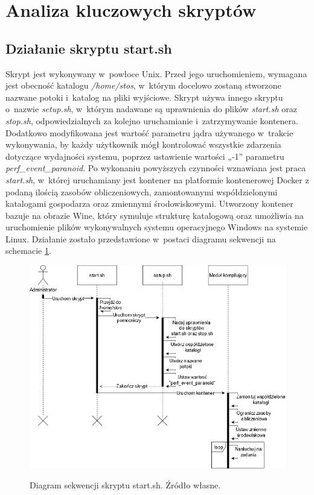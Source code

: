 \section{Analiza kluczowych skryptów}
\subsection{Działanie skryptu start.sh}
\indent Skrypt jest wykonywany w~powłoce Unix. Przed jego uruchomieniem, wymagana jest obecność katalogu \textit{/home/stos}, w~którym docelowo zostaną stworzone nazwane potoki i~katalog na pliki wyjściowe. Skrypt używa innego skryptu o~nazwie \textit{setup.sh}, w~którym nadawane są uprawnienia do plików \textit{start.sh} oraz \textit{stop.sh}, odpowiedzialnych za kolejno uruchamianie i~zatrzymywanie kontenera. Dodatkowo modyfikowana jest wartość parametru jądra używanego w~trakcie wykonywania, by każdy użytkownik mógł kontrolować wszystkie zdarzenia dotyczące wydajności systemu, poprzez ustawienie wartości „-1” parametru \textit{perf\_event\_paranoid}\cite{perf}. Po wykonaniu powyższych czynności wznawiana jest praca \textit{start.sh}, w~której uruchamiany jest kontener na platformie kontenerowej Docker z podaną ilością zasobów obliczeniowych, zamontowanymi współdzielonymi katalogami gospodarza oraz zmiennymi środowiskowymi. Utworzony kontener bazuje na obrazie Wine, który symuluje strukturę katalogową oraz umożliwia na uruchomienie plików wykonywalnych systemu operacyjnego Windows na systemie Linux. Działanie zostało przedstawione w~postaci diagramu sekwencji na schemacie \ref{start}.
\begin{figure}[!h]
	\begin{center}
		\resizebox{1.0\textwidth}{!} {
			\includegraphics{img/2/start.png}
		}
		\caption[Diagram sekwenji skryptu start.sh]{Diagram sekwencji skryptu start.sh. Źródło własne.}
		\label{start}
	\end{center}
\end{figure}

